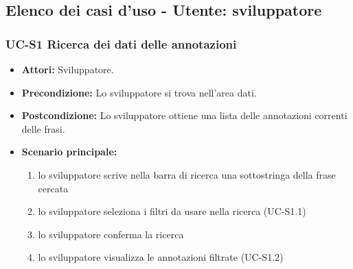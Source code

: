 \subsection{Elenco dei casi d'uso - Utente: sviluppatore}	

\subsubsection{UC-S1 Ricerca dei dati delle annotazioni}
		\begin{itemize}
			\item \textbf{Attori:} Sviluppatore.
			\item \textbf{Precondizione:} Lo sviluppatore si trova nell'area dati.
			\item \textbf{Postcondizione:} Lo sviluppatore ottiene una lista delle annotazioni correnti delle frasi.
			\item \textbf{Scenario principale:}
				\begin{enumerate}
					\item lo sviluppatore scrive nella barra di ricerca una sottostringa della frase cercata
					\item lo sviluppatore seleziona i filtri da usare nella ricerca (UC-S1.1)
					\item lo sviluppatore conferma la ricerca
					\item lo sviluppatore visualizza le annotazioni filtrate (UC-S1.2)
				\end{enumerate}
		\end{itemize}
	
